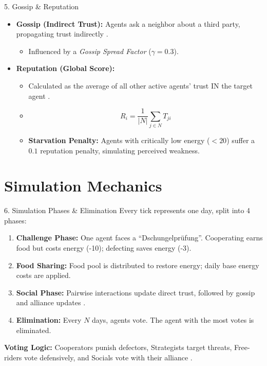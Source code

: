 \documentclass{beamer}
\begin{document}
\begin{frame}{5. Gossip \& Reputation}
    \begin{itemize}
        \item \textbf{Gossip (Indirect Trust):} Agents ask a neighbor about a third party, propagating trust indirectly \cite{Mui}.
        \begin{itemize}
            \item Influenced by a \textit{Gossip Spread Factor} ($\gamma = 0.3$).
        \end{itemize}
        \item \textbf{Reputation (Global Score):}
        \begin{itemize}
            \item Calculated as the average of all other active agents' trust IN the target agent \cite{Mui}.
            \item $$R_i = \frac{1}{|N|} \sum_{j \in N} T_{ji}$$
            \item \textbf{Starvation Penalty:} Agents with critically low energy ($< 20$) suffer a $0.1$ reputation penalty, simulating perceived weakness.
        \end{itemize}
    \end{itemize}
\end{frame}

\section{Simulation Mechanics}

\begin{frame}{6. Simulation Phases \& Elimination}
    Every tick represents one day, split into 4 phases:
    \begin{enumerate}
        \item \textbf{Challenge Phase:} One agent faces a ``Dschungelpr\"{u}fung''. Cooperating earns food but costs energy (-10); defecting saves energy (-3).
        \item \textbf{Food Sharing:} Food pool is distributed to restore energy; daily base energy costs are applied.
        \item \textbf{Social Phase:} Pairwise interactions update direct trust, followed by gossip and alliance updates \cite{Mui}.
        \item \textbf{Elimination:} Every $N$ days, agents vote. The agent with the most votes is eliminated.
    \end{enumerate}
    \vspace{0.2cm}
    \textbf{Voting Logic:} Cooperators punish defectors, Strategists target threats, Free-riders vote defensively, and Socials vote with their alliance \cite{Wooldridge}.
\end{frame}
\end{document}
